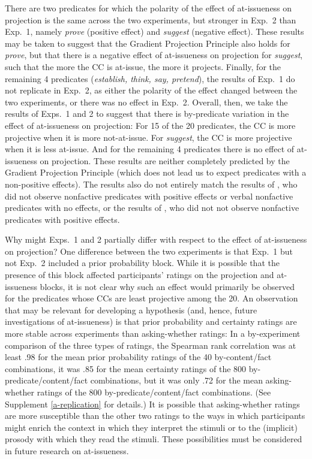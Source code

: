 \documentclass[11pt,fleqn]{article}
\newcommand{\6}{\mbox{$[\hspace*{-.6mm}[$}}
\newcommand{\9}{\mbox{$]\hspace*{-.6mm}]$}}
\begin{document}
There are two predicates for which the polarity of the effect of at-issueness on projection is the same across the two experiments, but stronger in Exp.~2 than Exp.~1, namely {\em prove} (positive effect) and {\em suggest} (negative effect). These results may be taken to suggest that the Gradient Projection Principle also holds for {\em prove}, but that there is a negative effect of at-issueness on projection for {\em suggest}, such that the more the CC is at-issue, the more it projects. Finally, for the remaining 4 predicates ({\em establish, think, say, pretend}), the results of Exp.~1 do not replicate in Exp.~2, as either the polarity of the effect changed between the two experiments, or there was no effect in Exp.~2. Overall, then, we take the results of Exps.~1 and 2 to suggest that there is by-predicate variation in the effect of at-issueness on projection: For 15 of the 20 predicates, the CC is more projective when it is more not-at-issue. For {\em suggest}, the CC is more projective when it is less at-issue. And for the remaining 4 predicates there is no effect of at-issueness on projection. These results  are neither completely predicted by the Gradient Projection Principle (which does not lead us to expect predicates with a non-positive effects). The results also do not entirely match the results of \citealt{djaerv-bacovcin-salt27,djaerv-bacovcin2020}, who did not observe nonfactive predicates with positive effects or verbal nonfactive predicates with no effects, or the results of \citealt{mahler-etal2020}, who did not not observe nonfactive predicates with positive effects.

Why might Exps.~1 and 2 partially differ with respect to the effect of at-issueness on projection? One difference between the two experiments is that Exp.~1 but not Exp.~2 included a prior probability block. While it is possible that the presence of this block affected participants' ratings on the projection and at-issueness blocks, it is not clear why such an effect would primarily be observed for the predicates whose CCs are least projective among the 20. An observation that may be relevant for developing a hypothesis (and, hence, future investigations of at-issueness) is that prior probability and certainty ratings are more stable across experiments than asking-whether ratings: In a by-experiment comparison of the three types of ratings, the Spearman rank correlation was at least .98 for the mean prior probability ratings of the 40 by-content/fact combinations, it was .85  for the mean certainty ratings of the 800 by-predicate/content/fact combinations, but it was only .72 for the mean asking-whether ratings of the 800 by-predicate/content/fact combinations. (See Supplement \ref{a-replication} for details.) It is possible that asking-whether ratings are more susceptible than the other two ratings to the ways in which participants might enrich the context in which they interpret the stimuli or to the (implicit) prosody with which they read the stimuli. These possibilities must be considered in future research on at-issueness.
\end{document}
